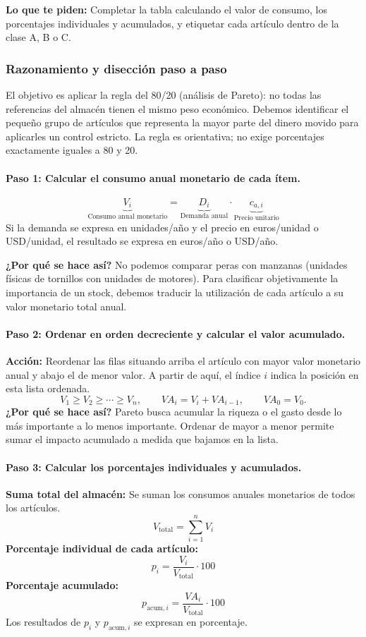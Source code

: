 \documentclass[11pt,a4paper]{article}
\begin{document}
\textbf{Lo que te piden:} Completar la tabla calculando el valor de consumo, los porcentajes individuales y acumulados, y etiquetar cada artículo dentro de la clase A, B o C.

\subsubsection{Razonamiento y disección paso a paso}
El objetivo es aplicar la regla del 80/20 (análisis de Pareto): no todas las referencias del almacén tienen el mismo peso económico. Debemos identificar el pequeño grupo de artículos que representa la mayor parte del dinero movido para aplicarles un control estricto. La regla es orientativa; no exige porcentajes exactamente iguales a 80 y 20.

\paragraph{Paso 1: Calcular el consumo anual monetario de cada ítem.}
\[
    \underbrace{V_i}_{\text{Consumo anual monetario}}
    =
    \underbrace{D_i}_{\text{Demanda anual}}
    \cdot
    \underbrace{c_{a,i}}_{\text{Precio unitario}}
\]
Si la demanda se expresa en unidades/año y el precio en euros/unidad o USD/unidad, el resultado se expresa en euros/año o USD/año.

\textbf{¿Por qué se hace así?} No podemos comparar peras con manzanas (unidades físicas de tornillos con unidades de motores). Para clasificar objetivamente la importancia de un stock, debemos traducir la utilización de cada artículo a su valor monetario total anual.

\paragraph{Paso 2: Ordenar en orden decreciente y calcular el valor acumulado.}
\textbf{Acción:} Reordenar las filas situando arriba el artículo con mayor valor monetario anual y abajo el de menor valor. A partir de aquí, el índice $i$ indica la posición en esta lista ordenada.
\[
    V_1 \geq V_2 \geq \cdots \geq V_n,
    \qquad
    VA_i = V_i + VA_{i-1},
    \qquad VA_0 = V_0.
\]
\textbf{¿Por qué se hace así?} Pareto busca acumular la riqueza o el gasto desde lo más importante a lo menos importante. Ordenar de mayor a menor permite sumar el impacto acumulado a medida que bajamos en la lista.

\paragraph{Paso 3: Calcular los porcentajes individuales y acumulados.}
\textbf{Suma total del almacén:} Se suman los consumos anuales monetarios de todos los artículos.
\[
    V_{\text{total}} = \sum_{i=1}^{n} V_i
\]
\textbf{Porcentaje individual de cada artículo:}
\[
    p_i = \frac{V_i}{V_{\text{total}}}\cdot 100
\]
\textbf{Porcentaje acumulado:}
\[
    p_{\text{acum},i} = \frac{VA_i}{V_{\text{total}}}\cdot 100
\]
Los resultados de $p_i$ y $p_{\text{acum},i}$ se expresan en porcentaje.
\end{document}

